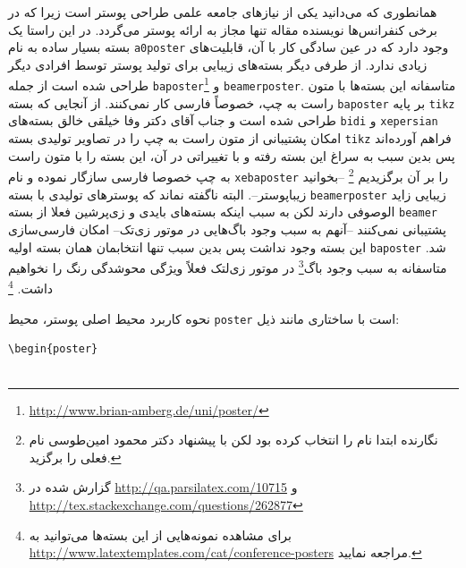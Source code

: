 \documentclass[debug,a0paper,persian]{xebaposter}
\begin{document}
\begin{poster}
\begin{posterbox}[name=introduction,column=0,row=0,headershape=smallrounded]%
{}
همانطوری که می‌دانید یکی از نیازهای جامعه علمی طراحی پوستر است زیرا که در برخی کنفرانس‌ها نویسنده مقاله تنها مجاز به ارائه پوستر 
می‌گردد. در این راستا یک بسته بسیار ساده به نام \texttt{a0poster} وجود دارد که در عین سادگی کار با آن، قابلیت‌های زیادی ندارد.
از طرفی دیگر بسته‌های زیبایی برای تولید پوستر توسط افرادی دیگر طراحی شده است 
از جمله \texttt{baposter}\footnote{\url{http://www.brian-amberg.de/uni/poster/}}
 و \texttt{beamerposter}. 
متاسفانه این بسته‌ها با متون راست به چپ، خصوصاً فارسی کار نمی‌کنند. از آنجایی که بسته \texttt{baposter} 
بر پایه \texttt{tikz} طراحی شده است و جناب آقای دکتر وفا خیلقی خالق 
بسته‌های \texttt{bidi} و \texttt{xepersian} امکان پشتیبانی از متون 
راست به چپ را در تصاویر تولیدی بسته \texttt{tikz} فراهم آورده‌اند پس بدین سبب به سراغ این بسته رفته و با تغییراتی در آن، 
این بسته را با متون راست به چپ خصوصا فارسی سازگار نموده و نام \texttt{xebaposter} را بر آن برگزیدیم%
\footnote{نگارنده ابتدا نام  را انتخاب کرده بود لکن با پیشنهاد دکتر محمود امین‌طوسی نام فعلی را برگزید.}
--بخوانید زیباپوستر--. 
البته ناگفته نماند که پوسترهای تولیدی با بسته \texttt{beamerposter} زیبایی زاید الوصوفی دارند لکن به سبب اینکه بسته‌های 
بایدی و زی‌پرشین فعلا از بسته \texttt{beamer} پشتیبانی نمی‌کنند --آنهم به سبب وجود باگ‌هایی در موتور زی‌تک-- امکان 
فارسی‌سازی این بسته وجود نداشت پس بدین سبب تنها انتخابمان همان بسته اولیه \texttt{baposter} شد.
متاسفانه به سبب وجود باگ‌\footnote{گزارش شده در \url{http://qa.parsilatex.com/10715} 
و \url{http://tex.stackexchange.com/questions/262877}} در موتور زی‌لتک فعلاً ویژگی محوشدگی رنگ را نخواهیم داشت.%
\footnote{برای مشاهده
نمونه‌هایی از این بسته‌ها می‌توانید به \url{http://www.latextemplates.com/cat/conference-posters} مراجعه نمایید.}
\end{posterbox}
\begin{posterbox}[name=usage,column=1,span=1,headershape=rounded,textborder=rectangle
,textborder=faded]{نحوه کاربرد}
محیط اصلی پوستر، محیط \texttt{poster} است با ساختاری مانند ذیل:
\begin{latin}
\vspace{-2mm}
\begin{verbatim}
\begin{poster}


\end{verbatim}
\end{latin}
\end{posterbox}
\end{poster}
\end{document}
